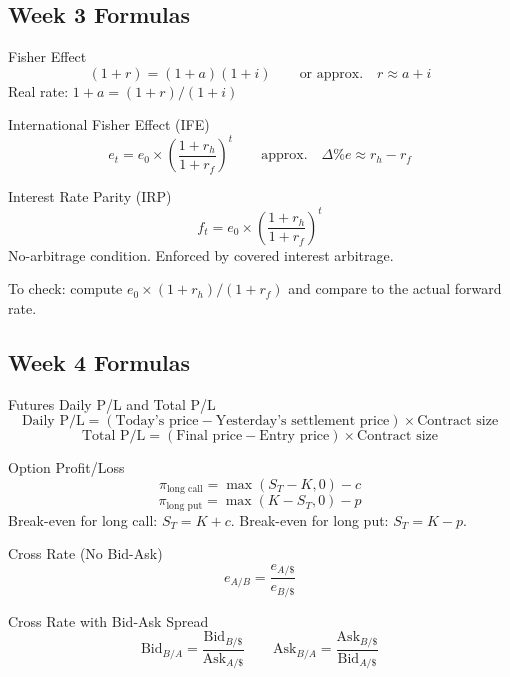 \documentclass[11pt,a4paper]{article}
\begin{document}
\subsection*{Week 3 Formulas}

\begin{formulabox}{Fisher Effect}
\[
  (1 + r) = (1 + a)(1 + i) \qquad \text{or approx.} \quad r \approx a + i
\]
Real rate: $1 + a = (1+r)/(1+i)$
\end{formulabox}

\begin{formulabox}{International Fisher Effect (IFE)}
\[
  e_t = e_0 \times \left(\frac{1 + r_h}{1 + r_f}\right)^t \qquad \text{approx.} \quad \Delta\%e \approx r_h - r_f
\]
\end{formulabox}

\begin{formulabox}{Interest Rate Parity (IRP)}
\[
  f_t = e_0 \times \left(\frac{1 + r_h}{1 + r_f}\right)^t
\]
No-arbitrage condition. Enforced by covered interest arbitrage.

To check: compute $e_0 \times (1+r_h)/(1+r_f)$ and compare to the actual forward rate.
\end{formulabox}

\subsection*{Week 4 Formulas}

\begin{formulabox}{Futures Daily P/L and Total P/L}
\[
  \text{Daily P/L} = (\text{Today's price} - \text{Yesterday's settlement price}) \times \text{Contract size}
\]
\[
  \text{Total P/L} = (\text{Final price} - \text{Entry price}) \times \text{Contract size}
\]
\end{formulabox}

\begin{formulabox}{Option Profit/Loss}
\[
  \pi_{\text{long call}} = \max(S_T - K, 0) - c
\]
\[
  \pi_{\text{long put}} = \max(K - S_T, 0) - p
\]
Break-even for long call: $S_T = K + c$. Break-even for long put: $S_T = K - p$.
\end{formulabox}

\begin{formulabox}{Cross Rate (No Bid-Ask)}
\[
  e_{A/B} = \frac{e_{A/\$}}{e_{B/\$}}
\]
\end{formulabox}

\begin{formulabox}{Cross Rate with Bid-Ask Spread}
\[
  \text{Bid}_{B/A} = \frac{\text{Bid}_{B/\$}}{\text{Ask}_{A/\$}} \qquad \text{Ask}_{B/A} = \frac{\text{Ask}_{B/\$}}{\text{Bid}_{A/\$}}
\]
\end{formulabox}
\end{document}
